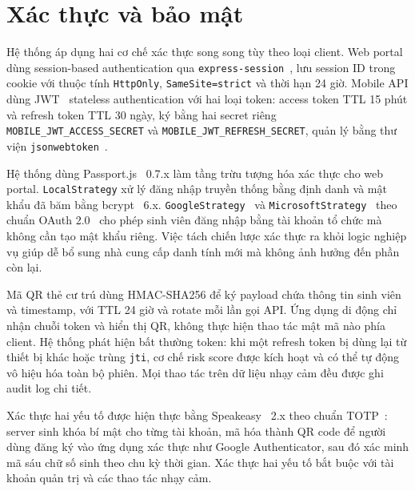\documentclass[../DoAn.tex]{subfiles}
\begin{document}
\section{Xác thực và bảo mật}
\label{sec:security}

Hệ thống áp dụng hai cơ chế xác thực song song tùy theo loại client. Web portal
dùng session-based authentication qua \texttt{express-session}~\cite{express_session_docs},
lưu session ID trong cookie với thuộc tính \texttt{HttpOnly}, \texttt{SameSite=strict}
và thời hạn 24 giờ. Mobile API dùng JWT~\cite{rfc7519} stateless authentication
với hai loại token: access token TTL 15 phút và refresh token TTL 30 ngày, ký
bằng hai secret riêng \texttt{MOBILE\_JWT\_ACCESS\_SECRET} và
\texttt{MOBILE\_JWT\_REFRESH\_SECRET}, quản lý bằng thư viện
\texttt{jsonwebtoken}~\cite{jsonwebtoken_docs}.

Hệ thống dùng Passport.js~\cite{passportjs_docs} 0.7.x làm tầng trừu tượng
hóa xác thực cho web portal. \texttt{LocalStrategy} xử lý đăng nhập truyền
thống bằng định danh và mật khẩu đã băm bằng bcrypt~\cite{bcrypt_npm} 6.x.
\texttt{GoogleStrategy}~\cite{passport_google_docs} và
\texttt{MicrosoftStrategy}~\cite{passport_microsoft_docs} theo chuẩn OAuth
2.0~\cite{rfc6749} cho phép sinh viên đăng nhập bằng tài khoản tổ chức mà
không cần tạo mật khẩu riêng. Việc tách chiến lược xác thực ra khỏi logic
nghiệp vụ giúp dễ bổ sung nhà cung cấp danh tính mới mà không ảnh hưởng đến
phần còn lại.

Mã QR thẻ cư trú dùng HMAC-SHA256 để ký payload chứa thông tin sinh viên và
timestamp, với TTL 24 giờ và rotate mỗi lần gọi API. Ứng dụng di động chỉ
nhận chuỗi token và hiển thị QR, không thực hiện thao tác mật mã nào phía
client. Hệ thống phát hiện bất thường token: khi một refresh token bị dùng lại
từ thiết bị khác hoặc trùng \texttt{jti}, cơ chế risk score được kích hoạt và
có thể tự động vô hiệu hóa toàn bộ phiên. Mọi thao tác trên dữ liệu nhạy cảm
đều được ghi audit log chi tiết.

Xác thực hai yếu tố được hiện thực bằng Speakeasy~\cite{speakeasy_npm} 2.x
theo chuẩn TOTP~\cite{rfc6238}: server sinh khóa bí mật cho từng tài khoản,
mã hóa thành QR code để người dùng đăng ký vào ứng dụng xác thực như Google
Authenticator, sau đó xác minh mã sáu chữ số sinh theo chu kỳ thời gian.
Xác thực hai yếu tố bắt buộc với tài khoản quản trị và các thao tác nhạy cảm.
\end{document}
